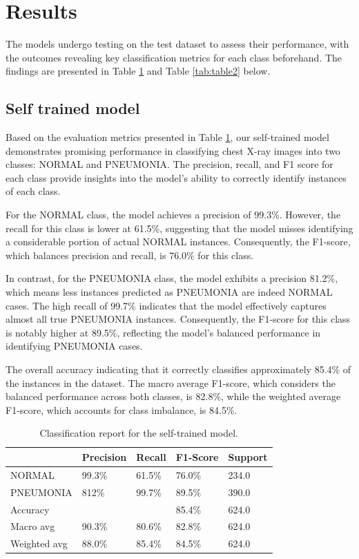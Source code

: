\documentclass{article}
\begin{document}
\section{Results}
The models undergo testing on the test dataset to assess their performance, with the outcomes revealing key classification metrics for each class beforehand. The findings are presented in Table \ref{tab:table1} and Table \ref{tab:table2} below.

\subsection{Self trained model}
Based on the evaluation metrics presented in Table \ref{tab:table1}, our self-trained model demonstrates promising performance in classifying chest X-ray images into two classes: NORMAL and PNEUMONIA. The precision, recall, and F1 score for each class provide insights into the model's ability to correctly identify instances of each class.

For the NORMAL class, the model achieves a precision of 99.3\%. However, the recall for this class is lower at 61.5\%, suggesting that the model misses identifying a considerable portion of actual NORMAL instances. Consequently, the F1-score, which balances precision and recall, is 76.0\% for this class.

In contrast, for the PNEUMONIA class, the model exhibits a precision 81.2\%, which means less instances predicted as PNEUMONIA are indeed NORMAL cases. The high recall of 99.7\% indicates that the model effectively captures almost all true PNEUMONIA instances. Consequently, the F1-score for this class is notably higher at 89.5\%, reflecting the model's balanced performance in identifying PNEUMONIA cases.

The overall accuracy indicating that it correctly classifies approximately 85.4\% of the instances in the dataset. The macro average F1-score, which considers the balanced performance across both classes, is 82.8\%, while the weighted average F1-score, which accounts for class imbalance, is 84.5\%.

\begin{table}[!htb]
  \caption{Classification report for the self-trained model.}
  \centering
  \begin{tabular}{lllll}
    \toprule
    \cmidrule(r){1-4}
                 & Precision & Recall & F1-Score & Support \\
    \midrule
    NORMAL       & 99.3\%    & 61.5\% & 76.0\%   & 234.0   \\
    PNEUMONIA    & 812\%     & 99.7\% & 89.5\%   & 390.0   \\
    Accuracy     &           &        & 85.4\%   & 624.0   \\
    Macro avg    & 90.3\%    & 80.6\% & 82.8\%   & 624.0   \\
    Weighted avg & 88.0\%    & 85.4\% & 84.5\%   & 624.0   \\
    \bottomrule
  \end{tabular}
  \label{tab:table1}
\end{table}
\end{document}
